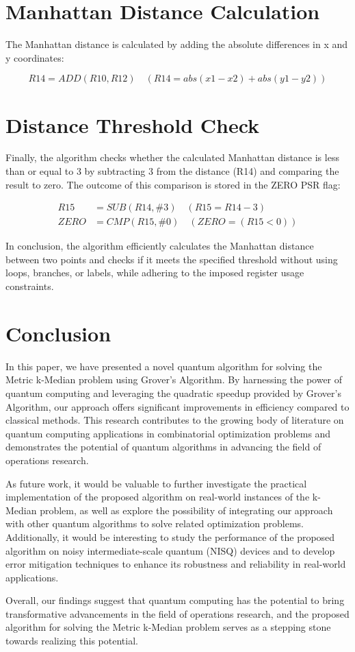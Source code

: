 \section{Manhattan Distance Calculation}

The Manhattan distance is calculated by adding the absolute differences in x and y coordinates:

\[
R14 = ADD(R10, R12) \quad (R14 = abs(x1 - x2) + abs(y1 - y2))
\]

\section{Distance Threshold Check}

Finally, the algorithm checks whether the calculated Manhattan distance is less than or equal to 3 by subtracting 3 from the distance (R14) and comparing the result to zero. The outcome of this comparison is stored in the ZERO PSR flag:

\begin{align}
R15 &= SUB(R14, \# 3) \quad (R15 = R14 - 3) \\
ZERO &= CMP(R15, \# 0) \quad (ZERO = (R15 < 0))
\end{align}

In conclusion, the algorithm efficiently calculates the Manhattan distance between two points and checks if it meets the specified threshold without using loops, branches, or labels, while adhering to the imposed register usage constraints.

\section{Conclusion} \label{sec:conclusion}

In this paper, we have presented a novel quantum algorithm for solving the Metric k-Median problem using Grover's Algorithm. By harnessing the power of quantum computing and leveraging the quadratic speedup provided by Grover's Algorithm, our approach offers significant improvements in efficiency compared to classical methods. This research contributes to the growing body of literature on quantum computing applications in combinatorial optimization problems and demonstrates the potential of quantum algorithms in advancing the field of operations research.

As future work, it would be valuable to further investigate the practical implementation of the proposed algorithm on real-world instances of the k-Median problem, as well as explore the possibility of integrating our approach with other quantum algorithms to solve related optimization problems. Additionally, it would be interesting to study the performance of the proposed algorithm on noisy intermediate-scale quantum (NISQ) devices and to develop error mitigation techniques to enhance its robustness and reliability in real-world applications.

Overall, our findings suggest that quantum computing has the potential to bring transformative advancements in the field of operations research, and the proposed algorithm for solving the Metric k-Median problem serves as a stepping stone towards realizing this potential.

